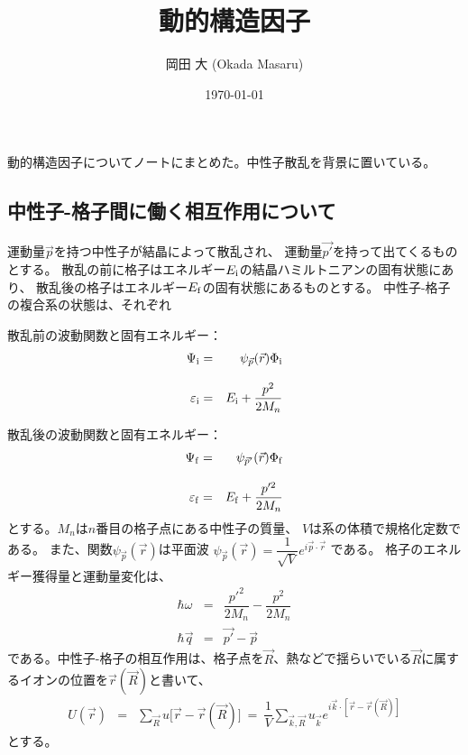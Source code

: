 \documentclass[a4j]{jsarticle}
\title{
動的構造因子
}
\author{岡田 大 (Okada Masaru)}
\date{\today}
\begin{document}
\maketitle

動的構造因子についてノートにまとめた。中性子散乱を背景に置いている。

\subsection*{中性子-格子間に働く相互作用について}

運動量$\vec{p}$を持つ中性子が結晶によって散乱され、
運動量$\vec{p'}$を持って出てくるものとする。
散乱の前に格子はエネルギー$E_{\rm i}$の結晶ハミルトニアンの固有状態にあり、
散乱後の格子はエネルギー$E_{\rm f}$の固有状態にあるものとする。
中性子-格子の複合系の状態は、それぞれ

\hspace{5mm}
散乱前の波動関数と固有エネルギー：
\begin{eqnarray}
	\Psi_{\rm i}
	&=&
	\psi_{\vec{p}}(\vec{r}) \Phi_{\rm i}
	\\[3mm]
	\varepsilon_{\rm i}
	&=&
	E_{\rm i} + \dfrac{p^{2}}{2 M_{n}}
\end{eqnarray}

\hspace{5mm}
散乱後の波動関数と固有エネルギー：
\begin{eqnarray}
	\Psi_{\rm f}
	&=&
	\psi_{\vec{p}'}(\vec{r}) \Phi_{\rm f}
	\\[3mm]
	\varepsilon_{\rm f}
	&=&
	E_{\rm f} + \dfrac{p'^{2}}{2 M_{n}}
\end{eqnarray}
とする。$M_{n}$は$n$番目の格子点にある中性子の質量、
$V$は系の体積で規格化定数である。
また、関数$\psi_{\vec{p}}(\vec{r})$は平面波
$
	\psi_{\vec{p}}(\vec{r}) = \dfrac{1}{\sqrt{V}} e^{i \vec{p} \cdot \vec{r}}
$
である。
格子のエネルギー獲得量と運動量変化は、
\begin{eqnarray}
	\hbar \omega
	&=&
	\dfrac{p'^{2}}{2 M_{n}}
	-
	\dfrac{p^{2}}{2 M_{n}}
	\\[2mm]
	\hbar \vec{q}
	&=&
	\vec{p'}
	-
	\vec{p}
\end{eqnarray}
である。中性子-格子の相互作用は、格子点を$\vec{R}$、熱などで揺らいでいる$\vec{R}$に属するイオンの位置を$\vec{r}(\vec{R})$と書いて、
\begin{eqnarray}
	U(\vec{r})
	&=&
	\sum_{\vec{R}}
	u \big[ \vec{r} - \vec{r}(\vec{R}) \big]
	\ = \
	\dfrac{1}{V}
	\sum_{\vec{k},\vec{R}}
	u_{\vec{k}} e^{i \vec{k} \cdot [ \vec{r} - \vec{r}(\vec{R}) ]}
\end{eqnarray}
とする。
\end{document}
